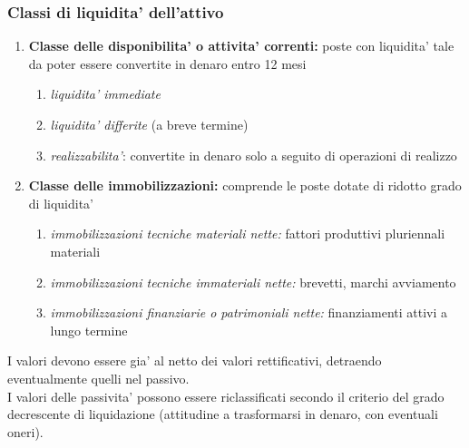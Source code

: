 \documentclass{report}
\begin{document}
	\subsubsection{Classi di liquidita' dell'attivo}
	\begin{enumerate}
		\item \textbf{Classe delle disponibilita' o attivita' correnti:} poste con liquidita' tale da poter essere convertite in denaro entro 12 mesi
		\begin{enumerate}[label=\alph*)]
			\item \textit{liquidita' immediate}
			\item \textit{liquidita' differite} (a breve termine)
			\item \textit{realizzabilita'}: convertite in denaro solo a seguito di operazioni di realizzo
		\end{enumerate}
		\item \textbf{Classe delle immobilizzazioni:} comprende le poste dotate di ridotto grado di liquidita'
		\begin{enumerate}[label=\alph*)]
			\item \textit{immobilizzazioni tecniche materiali nette:} fattori produttivi pluriennali materiali
			\item \textit{immobilizzazioni tecniche immateriali nette:} brevetti, marchi avviamento
			\item \textit{immobilizzazioni finanziarie o patrimoniali nette:} finanziamenti attivi a lungo termine
		\end{enumerate}
	\end{enumerate}
	I valori devono essere gia' al netto dei valori rettificativi, detraendo eventualmente quelli nel passivo.
	\medskip \\I valori delle passivita' possono essere riclassificati secondo il criterio del grado decrescente di liquidazione (attitudine  a trasformarsi in denaro, con eventuali oneri).
\end{document}
